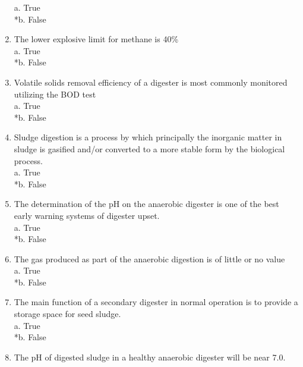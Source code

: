 \documentclass{article}
\begin{document}
\begin{enumerate}
a. True \\
*b. False \\

\item  The lower explosive limit for methane is 40\% \\

a. True \\
*b. False \\

\item  Volatile solids removal efficiency of a digester is most commonly monitored utilizing the BOD test\\

a. True \\
*b. False \\

\item  Sludge digestion is a process by which principally the inorganic matter in sludge is gasified and/or converted to a more stable form by the biological process. \\

a. True \\
*b. False \\

\item  The determination of the pH on the anaerobic digester is one of the best early warning systems of digester upset. \\

a. True \\
*b. False \\

\item  The gas produced as part of the anaerobic digestion is of little or no value \\

a. True \\
*b. False \\

\item  The main function of a secondary digester in normal operation is to provide a storage space for seed sludge. \\

a. True \\
*b. False \\

\item  The pH of digested sludge in a healthy anaerobic digester will be near 7.0. \\


\end{enumerate}
\end{document}
